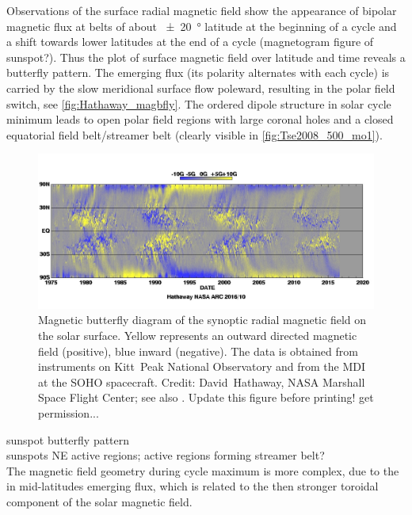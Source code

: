 Observations of the surface radial magnetic field show the appearance of bipolar magnetic flux at belts of about \SI{+-20}{\degree} latitude at the beginning of a cycle and a shift towards lower latitudes at the end of a cycle (magnetogram figure of sunspot?). Thus the plot of surface magnetic field over latitude and time reveals a butterfly pattern. The emerging flux (its polarity alternates with each cycle) is carried by the slow meridional surface flow poleward, resulting in the polar field switch, see \autoref{fig:Hathaway_magbfly}. The ordered dipole structure in solar cycle minimum leads to open polar field regions with large coronal holes and a closed equatorial field belt/streamer belt (clearly visible in \autoref{fig:Tse2008_500_mo1}).\\
\begin{figure}[htb]
	\centering
	\includegraphics[width=\textwidth]{images/Hathaway_magbfly_201610.jpg}
	\caption{Magnetic butterfly diagram of the synoptic radial magnetic field on the solar surface. Yellow represents an outward directed magnetic field (positive), blue inward (negative). The data is obtained from instruments on Kitt~Peak National Observatory and from the MDI at the SOHO spacecraft. Credit: David~Hathaway, NASA Marshall Space Flight Center; see also \citet[Fig.~17]{Hathaway2015}. Update this figure before printing! get permission...}
	\label{fig:Hathaway_magbfly}
\end{figure}

sunspot butterfly pattern \citep{Maunder1904}\\

sunspots NE active regions; active regions forming streamer belt?\\

The magnetic field geometry during cycle maximum is more complex, due to the in mid-latitudes emerging flux, which is related to the then stronger toroidal component of the solar magnetic field.\\

